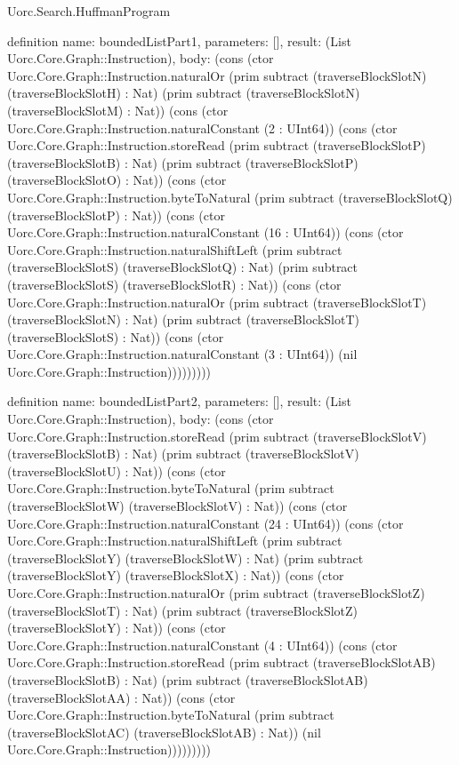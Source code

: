 \begin{lexlean}{Uorc.Search.HuffmanProgram}
\begin{semanticmodule}
definition{
  name: boundedListPart1,
  parameters: [],
  result: (List Uorc.Core.Graph::Instruction),
  body: (cons (ctor Uorc.Core.Graph::Instruction.naturalOr (prim subtract (traverseBlockSlotN) (traverseBlockSlotH) : Nat) (prim subtract (traverseBlockSlotN) (traverseBlockSlotM) : Nat)) (cons (ctor Uorc.Core.Graph::Instruction.naturalConstant (2 : UInt64)) (cons (ctor Uorc.Core.Graph::Instruction.storeRead (prim subtract (traverseBlockSlotP) (traverseBlockSlotB) : Nat) (prim subtract (traverseBlockSlotP) (traverseBlockSlotO) : Nat)) (cons (ctor Uorc.Core.Graph::Instruction.byteToNatural (prim subtract (traverseBlockSlotQ) (traverseBlockSlotP) : Nat)) (cons (ctor Uorc.Core.Graph::Instruction.naturalConstant (16 : UInt64)) (cons (ctor Uorc.Core.Graph::Instruction.naturalShiftLeft (prim subtract (traverseBlockSlotS) (traverseBlockSlotQ) : Nat) (prim subtract (traverseBlockSlotS) (traverseBlockSlotR) : Nat)) (cons (ctor Uorc.Core.Graph::Instruction.naturalOr (prim subtract (traverseBlockSlotT) (traverseBlockSlotN) : Nat) (prim subtract (traverseBlockSlotT) (traverseBlockSlotS) : Nat)) (cons (ctor Uorc.Core.Graph::Instruction.naturalConstant (3 : UInt64)) (nil Uorc.Core.Graph::Instruction)))))))))
}

definition{
  name: boundedListPart2,
  parameters: [],
  result: (List Uorc.Core.Graph::Instruction),
  body: (cons (ctor Uorc.Core.Graph::Instruction.storeRead (prim subtract (traverseBlockSlotV) (traverseBlockSlotB) : Nat) (prim subtract (traverseBlockSlotV) (traverseBlockSlotU) : Nat)) (cons (ctor Uorc.Core.Graph::Instruction.byteToNatural (prim subtract (traverseBlockSlotW) (traverseBlockSlotV) : Nat)) (cons (ctor Uorc.Core.Graph::Instruction.naturalConstant (24 : UInt64)) (cons (ctor Uorc.Core.Graph::Instruction.naturalShiftLeft (prim subtract (traverseBlockSlotY) (traverseBlockSlotW) : Nat) (prim subtract (traverseBlockSlotY) (traverseBlockSlotX) : Nat)) (cons (ctor Uorc.Core.Graph::Instruction.naturalOr (prim subtract (traverseBlockSlotZ) (traverseBlockSlotT) : Nat) (prim subtract (traverseBlockSlotZ) (traverseBlockSlotY) : Nat)) (cons (ctor Uorc.Core.Graph::Instruction.naturalConstant (4 : UInt64)) (cons (ctor Uorc.Core.Graph::Instruction.storeRead (prim subtract (traverseBlockSlotAB) (traverseBlockSlotB) : Nat) (prim subtract (traverseBlockSlotAB) (traverseBlockSlotAA) : Nat)) (cons (ctor Uorc.Core.Graph::Instruction.byteToNatural (prim subtract (traverseBlockSlotAC) (traverseBlockSlotAB) : Nat)) (nil Uorc.Core.Graph::Instruction)))))))))
}


\end{semanticmodule}
\end{lexlean}
